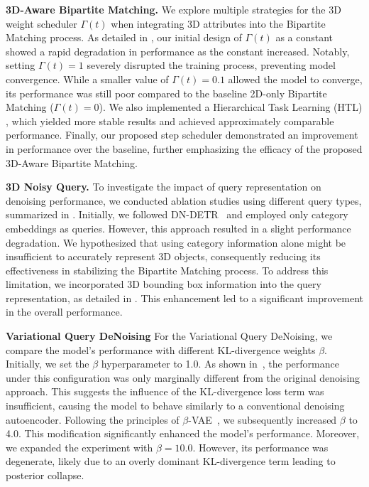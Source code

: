 
\noindent\textbf{3D-Aware Bipartite Matching.} We explore multiple strategies for the 3D weight scheduler $\Gamma(t)$ when integrating 3D attributes into the Bipartite Matching process. As detailed in , our initial design of $\Gamma(t)$ as a constant showed a rapid degradation in performance as the constant increased. Notably, setting $\Gamma(t)=1$ severely disrupted the training process, preventing model convergence. While a smaller value of $\Gamma(t)=0.1$ allowed the model to converge, its performance was still poor compared to the baseline 2D-only Bipartite Matching ($\Gamma(t)=0$). We also implemented a Hierarchical Task Learning (HTL) \cite{GUPNet}, which yielded more stable results and achieved approximately comparable performance. Finally, our proposed step scheduler demonstrated an improvement in performance over the baseline, further emphasizing the efficacy of the proposed 3D-Aware Bipartite Matching.


\noindent\textbf{3D Noisy Query.} To investigate the impact of query representation on denoising performance, we conducted ablation studies using different query types, summarized in . Initially, we followed DN-DETR~\cite{DN-DETR} and employed only category embeddings as queries. However, this approach resulted in a slight performance degradation. We hypothesized that using category information alone might be insufficient to accurately represent 3D objects, consequently reducing its effectiveness in stabilizing the Bipartite Matching process. To address this limitation, we incorporated 3D bounding box information into the query representation, as detailed in . This enhancement led to a significant improvement in the overall performance.


\noindent\textbf{Variational Query DeNoising} For the Variational Query DeNoising, we compare the model's performance with different KL-divergence weights $\beta$. Initially, we set the $\beta$ hyperparameter to 1.0. As shown in~, the performance under this configuration was only marginally different from the original denoising approach. This suggests the influence of the KL-divergence loss term was insufficient, causing the model to behave similarly to a conventional denoising autoencoder. Following the principles of $\beta$-VAE~\cite{betaVAE}, we subsequently increased $\beta$ to 4.0. This modification significantly enhanced the model's performance. Moreover, we expanded the experiment with $\beta=10.0$. However, its performance was degenerate, likely due to an overly dominant KL-divergence term leading to posterior collapse.

